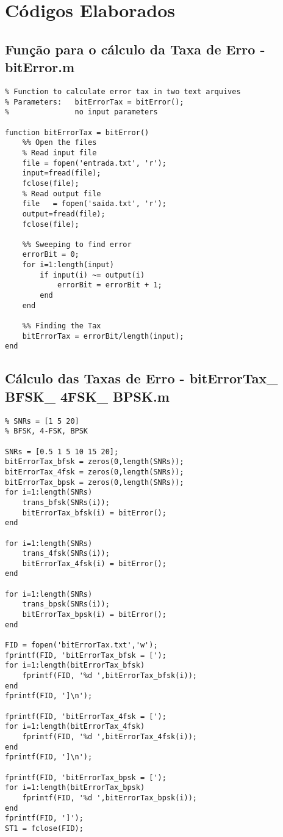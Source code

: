 \chapter{Códigos Elaborados}
\section{Função para o cálculo da Taxa de Erro - bitError.m}
\begin{lstlisting}
% Function to calculate error tax in two text arquives
% Parameters:   bitErrorTax = bitError();
%               no input parameters

function bitErrorTax = bitError()
    %% Open the files
    % Read input file
    file = fopen('entrada.txt', 'r');
    input=fread(file);
    fclose(file);
    % Read output file
    file   = fopen('saida.txt', 'r');
    output=fread(file);
    fclose(file);

    %% Sweeping to find error
    errorBit = 0;
    for i=1:length(input)
        if input(i) ~= output(i)
            errorBit = errorBit + 1;              
        end
    end

    %% Finding the Tax
    bitErrorTax = errorBit/length(input);
end
\end{lstlisting}

\section{Cálculo das Taxas de Erro - bitErrorTax\_ BFSK\_ 4FSK\_ BPSK.m}
\begin{lstlisting}
% SNRs = [1 5 20]
% BFSK, 4-FSK, BPSK

SNRs = [0.5 1 5 10 15 20];
bitErrorTax_bfsk = zeros(0,length(SNRs));
bitErrorTax_4fsk = zeros(0,length(SNRs));
bitErrorTax_bpsk = zeros(0,length(SNRs));
for i=1:length(SNRs)
    trans_bfsk(SNRs(i));
    bitErrorTax_bfsk(i) = bitError();
end

for i=1:length(SNRs)
    trans_4fsk(SNRs(i));
    bitErrorTax_4fsk(i) = bitError();
end

for i=1:length(SNRs)    
    trans_bpsk(SNRs(i));
    bitErrorTax_bpsk(i) = bitError();
end

FID = fopen('bitErrorTax.txt','w');
fprintf(FID, 'bitErrorTax_bfsk = [');
for i=1:length(bitErrorTax_bfsk)
    fprintf(FID, '%d ',bitErrorTax_bfsk(i));
end
fprintf(FID, ']\n');

fprintf(FID, 'bitErrorTax_4fsk = [');
for i=1:length(bitErrorTax_4fsk)
    fprintf(FID, '%d ',bitErrorTax_4fsk(i));
end
fprintf(FID, ']\n');

fprintf(FID, 'bitErrorTax_bpsk = [');
for i=1:length(bitErrorTax_bpsk)
    fprintf(FID, '%d ',bitErrorTax_bpsk(i));
end
fprintf(FID, ']');
ST1 = fclose(FID);
\end{lstlisting}

